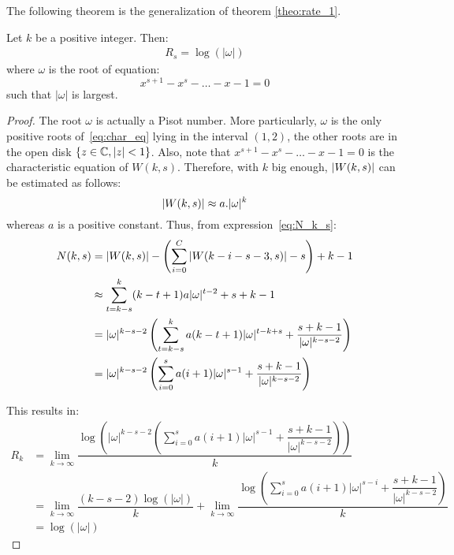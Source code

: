 The following theorem is the generalization of theorem \ref{theo:rate_1}.
\begin{theorem}\label{theo:rate_s}
    Let $k$ be a positive integer. Then:
    \begin{align}
        R_{s} = \log(\lvert\omega\rvert)
    \end{align}
    where $\omega$ is the root of equation: %
    \begin{equation}
        x^{s+1}-x^{s}-\ldots-x-1 = 0\label{eq:char_eq}
    \end{equation}
    such that $\lvert\omega\rvert$ is largest.
\end{theorem}
\begin{proof}
    
    The root $\omega$ is actually a Pisot number. More particularly, $\omega$ is the only positive roots of~\ref{eq:char_eq} lying in the interval $(1,2)$, the other roots are in the open disk $\left\{z\in\mathbb{C},\left \lvert z \right \rvert<1\right\}$. Also, note that $x^{s+1}-x^{s}-\ldots-x-1=0$ is the characteristic equation of $W(k,s)$. Therefore, with $k$ big enough, $\left \lvert W(k,s) \right \rvert$ can be estimated as follows: \[\left \lvert W(k,s) \right \rvert \approx a.\lvert\omega\rvert^{k}\] whereas $a$ is a positive constant. Thus, from expression~\ref{eq:N_k_s}:
    \begin{align*}
        N(k,s) &= \left \lvert  W(k,s) \right \rvert - \left(\sum_{i=0}^{C}\left \lvert  W(k-i-s-3,s) \right \rvert - s\right) + k - 1 \\
        &\approx \sum_{t=k-s}^{k}(k-t+1)a\lvert\omega\rvert^{t-2} + s + k - 1\\
        &= \lvert\omega\rvert^{k-s-2}\left( \sum_{t=k-s}^{k}a(k-t+1)\lvert\omega\rvert^{t-k+s} + \dfrac{s+k-1}{\lvert\omega\rvert^{k-s-2}}\right)\\
        &= \lvert\omega\rvert^{k-s-2}\left( \sum_{i=0}^{s}a(i+1)\lvert\omega\rvert^{s-1} + \dfrac{s+k-1}{\lvert\omega\rvert^{k-s-2}}\right) 
    \end{align*}

    This results in:
    \begin{align*}
        R_{k} &= \lim_{k\to\infty}\dfrac{\log\left( \lvert\omega\rvert^{k-s-2}\left(\sum_{i=0}^{s}a(i+1)\lvert\omega\rvert^{s-1}+\dfrac{s+k-1}{\lvert\omega\rvert^{k-s-2}}\right)\right)}{k} \\
        &= \lim_{k\to\infty}\dfrac{(k-s-2)\log(\lvert\omega\rvert)}{k} + \lim_{k\to\infty}\dfrac{\log\left(\sum_{i=0}^{s}a(i+1)\lvert\omega\rvert^{s-i}+\dfrac{s+k-1}{\lvert\omega\rvert^{k-s-2}}\right)}{k}\\
        &= \log(\lvert\omega\rvert)
    \end{align*}
    
\end{proof}

